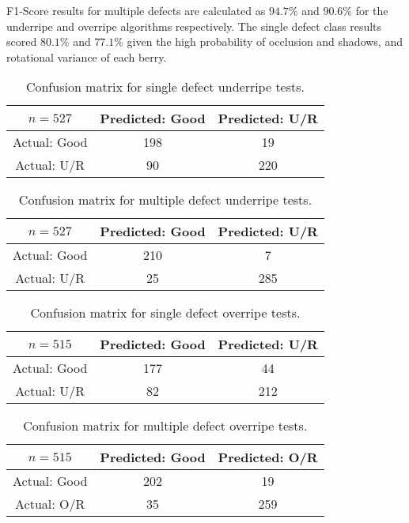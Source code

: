 \documentclass{bmvc2k}
\begin{document}
F1-Score results for multiple defects are calculated as $94.7\%$ and $90.6\%$ for the underripe and overripe algorithms respectively. The single defect class results scored $80.1\%$ and $77.1\%$ given the high probability of occlusion and shadows, and rotational variance of each berry.


\begin{table}
	\centering
	\caption{Confusion matrix for single defect underripe tests.}
	\label{tab:confusion_1}
	\begin{tabular}{ccc}
		\hline\hline
		$n=527$ & Predicted: Good & Predicted: U/R  \\ 
		\hline
		Actual: Good   & 198 & 19    \\[6pt] 
		Actual: U/R	   & 90  & 220  \\[6pt] 
		\hline\hline
	\end{tabular}
\end{table}

\begin{table}
	\centering
	\caption{Confusion matrix for multiple defect underripe tests.}
	\label{tab:confusion_2}
	\begin{tabular}{ccc}
		\hline\hline
		$n=527$ & Predicted: Good & Predicted: U/R  \\ 
		\hline
		Actual: Good   & 210 & 7    \\[6pt] 
		Actual: U/R	   & 25  & 285  \\[6pt] 
		\hline\hline
	\end{tabular}
\end{table}

\begin{table}
	\centering
	\caption{Confusion matrix for single defect overripe tests.}
	\label{tab:confusion_3}
	\begin{tabular}{ccc}
		\hline\hline
		$n=515$ & Predicted: Good & Predicted: U/R  \\ 
		\hline
		Actual: Good   & 177 & 44    \\[6pt] 
		Actual: U/R	   & 82  & 212  \\[6pt] 
		\hline\hline
	\end{tabular}
\end{table}

\begin{table}
	\centering
	\caption{Confusion matrix for multiple defect overripe tests.}
	\label{tab:confusion_4}
	\begin{tabular}{ccc}
		\hline\hline
		$n=515$ & Predicted: Good & Predicted: O/R  \\ 
		\hline
		Actual: Good   & 202 & 19    \\[6pt] 
		Actual: O/R	   & 35  & 259  \\[6pt] 
		\hline\hline
	\end{tabular}
\end{table}
\end{document}
